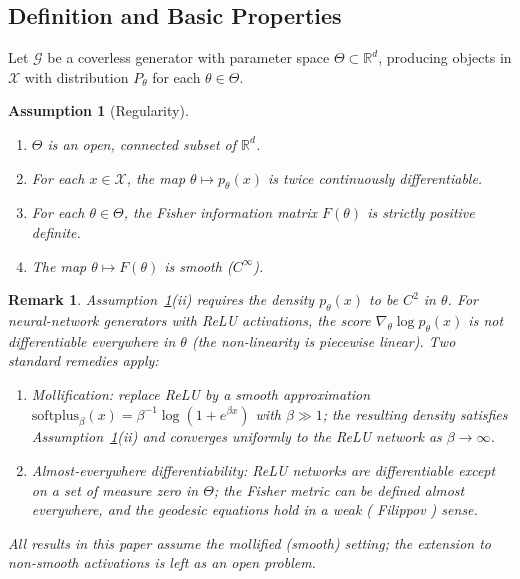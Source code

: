 \documentclass[a4paper,fleqn]{cas-dc}
\newtheorem{assumption}{Assumption}
\newtheorem{remark}{Remark}
\newcommand{\R}{\mathbb{R}}
\newcommand{\calG}{\mathcal{G}}
\begin{document}
\subsection{Definition and Basic Properties}

Let $\calG$ be a coverless generator with parameter space
$\Theta\subset\R^d$, producing objects in $\mathcal{X}$ with distribution
$P_\theta$ for each $\theta\in\Theta$.

\begin{assumption}[Regularity]
  \label{ass:regularity}
  \begin{enumerate}
    \item[(i)] $\Theta$ is an open, connected subset of $\R^d$.
    \item[(ii)] For each $x\in\mathcal{X}$, the map $\theta\mapsto p_\theta(x)$
          is twice continuously differentiable.
    \item[(iii)] For each $\theta\in\Theta$, the Fisher information matrix
          $F(\theta)$ is strictly positive definite.
    \item[(iv)] The map $\theta\mapsto F(\theta)$ is smooth ($C^\infty$).
  \end{enumerate}
\end{assumption}

\begin{remark}%
  \label{rem:relu_smoothness}
  Assumption~\ref{ass:regularity}(ii) requires the density $p_\theta(x)$
  to be $C^2$ in $\theta$.  For neural-network generators with ReLU
  activations, the score $\nabla_\theta \log p_\theta(x)$ is not
differentiable everywhere in $\theta$ (the non-linearity is piecewise
  linear).  Two standard remedies apply:
  \begin{enumerate}
    \item \emph{Mollification:} replace ReLU by a smooth approximation
          $\mathrm{softplus}_\beta(x) = \beta^{-1}\log(1+e^{\beta x})$
          with $\beta\gg 1$; the resulting density satisfies
          Assumption~\ref{ass:regularity}(ii) and converges uniformly to
          the ReLU network as $\beta\to\infty$.
    \item \emph{Almost-everywhere differentiability:} ReLU networks are
          differentiable except on a set of measure zero in $\Theta$;
          the Fisher metric can be defined almost everywhere, and the
          geodesic equations hold in a weak ( Filippov ) sense.
  \end{enumerate}
  All results in this paper assume the mollified (smooth) setting;
  the extension to non-smooth activations is left as an open problem.
\end{remark}
\end{document}
